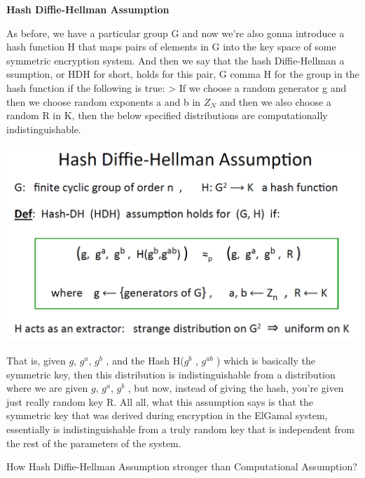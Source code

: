 \documentclass[11pt]{article}
\makeatletter
\def\maxwidth{\ifdim\Gin@nat@width>\linewidth\linewidth
    \else\Gin@nat@width\fi}
\let\Oldincludegraphics\includegraphics
\renewcommand{\includegraphics}[1]{\Oldincludegraphics[width=.8\maxwidth]{#1}}
\makeatother
\begin{document}
\textbf{Hash Diffie-Hellman Assumption}

As before, we have a particular group G and now we're also gonna
introduce a hash function H that maps pairs of elements in G into the
key space of some symmetric encryption system. And then we say that the
hash Diffie-Hellman a ssumption, or HDH for short, holds for this pair,
G comma H for the group in the hash function if the following is true:
\textgreater{} If we choose a random generator g and then we choose
random exponents a and b in \(Z_{N}\) and then we also choose a random R
in K, then the below specified distributions are computationally
indistinguishable.

\includegraphics{./Images/Hash-DH-Assump.png}

That is, given \(g\), \(g^{a}\), \(g^{b}\) , and the Hash H(\(g^{b}\) ,
\(g^{ab}\) ) which is basically the symmetric key, then this
distribution is indistinguishable from a distribution where we are given
\(g\), \(g^{a}\), \(g^{b}\) , but now, instead of giving the hash,
you're given just really random key R. All all, what this assumption
says is that the symmetric key that was derived during encryption in the
ElGamal system, essentially is indistinguishable from a truly random key
that is independent from the rest of the parameters of the system.

How Hash Diffie-Hellman Assumption stronger than Computational
Assumption?
\end{document}
